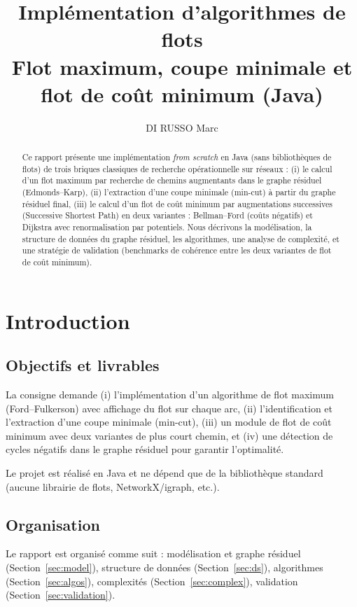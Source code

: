 \documentclass{rapport}
\title{Implémentation d'algorithmes de flots\\Flot maximum, coupe minimale et flot de coût minimum (Java)}
\author{DI RUSSO Marc}
\date{}
\begin{document}
\maketitle

\begin{abstract}
Ce rapport présente une implémentation \emph{from scratch} en Java (sans bibliothèques de flots) de trois briques classiques de recherche opérationnelle sur réseaux :
(i) le calcul d'un flot maximum par recherche de chemins augmentants dans le graphe résiduel (Edmonds--Karp),
(ii) l'extraction d'une coupe minimale (min-cut) à partir du graphe résiduel final,
(iii) le calcul d'un flot de coût minimum par augmentations successives (Successive Shortest Path) en deux variantes : Bellman--Ford (coûts négatifs) et Dijkstra avec renormalisation par potentiels.
Nous décrivons la modélisation, la structure de données du graphe résiduel, les algorithmes, une analyse de complexité, et une stratégie de validation (benchmarks de cohérence entre les deux variantes de flot de coût minimum).
\end{abstract}

\clearpage
\tableofcontents
\clearpage

\section{Introduction}
\subsection{Objectifs et livrables}
La consigne demande (i) l'implémentation d'un algorithme de flot maximum (Ford--Fulkerson) avec affichage du flot sur chaque arc, (ii) l'identification et l'extraction d'une coupe minimale (min-cut), (iii) un module de flot de coût minimum avec deux variantes de plus court chemin, et (iv) une détection de cycles négatifs dans le graphe résiduel pour garantir l'optimalité.

Le projet est réalisé en Java et ne dépend que de la bibliothèque standard (aucune librairie de flots, NetworkX/igraph, etc.).

\subsection{Organisation}
Le rapport est organisé comme suit : modélisation et graphe résiduel (Section~\ref{sec:model}), structure de données (Section~\ref{sec:ds}), algorithmes (Section~\ref{sec:algos}), complexités (Section~\ref{sec:complex}), validation (Section~\ref{sec:validation}).
\end{document}
